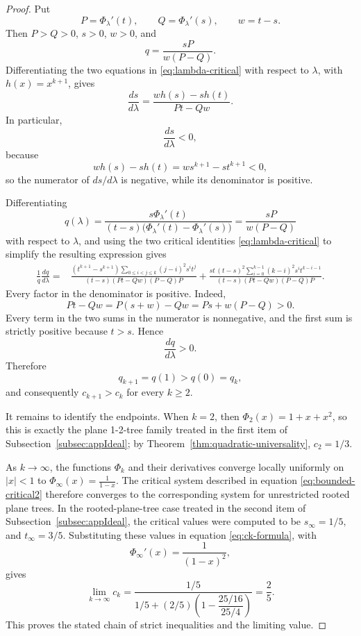 \documentclass[11pt, onesided]{amsart}
\theoremstyle{remark}
\begin{document}
\begin{proof}
Put
\[
P=\Phi_\lambda'(t),
\qquad
Q=\Phi_\lambda'(s),
\qquad
w=t-s.
\]
Then $P>Q>0$, $s>0$, $w>0$, and
\[
q=\frac{sP}{w(P-Q)}.
\]
Differentiating the two equations in \eqref{eq:lambda-critical} with respect to $\lambda$, with $h(x)=x^{k+1}$, gives
\[
\frac{ds}{d\lambda}
=
\frac{w h(s)-s h(t)}{Pt-Qw}.
\]
In particular,
\[
\frac{ds}{d\lambda}<0,
\]
because
\[
w h(s)-s h(t)
=w s^{k+1}-s t^{k+1}<0,
\] so the numerator of $ds/d\lambda$ is negative, while its denominator is positive. 

Differentiating
\[
q(\lambda)=
\frac{s\Phi_\lambda'(t)}
{(t-s)\bigl(\Phi_\lambda'(t)-\Phi_\lambda'(s)\bigr)}
=
\frac{sP}{w(P-Q)}
\]
with respect to $\lambda$, and using the two critical identities
\eqref{eq:lambda-critical} to simplify the resulting expression gives
\begin{align}
\label{eq:qderivative-positive}
\frac1q\frac{dq}{d\lambda}
={}&
\frac{
(t^{k+1}-s^{k+1})
\displaystyle\sum_{0\le i<j\le k}(j-i)^2s^it^j
}
{(t-s)(Pt-Qw)(P-Q)P}
+
\frac{
s t\,(t-s)^2
\displaystyle\sum_{i=0}^{k-1}(k-i)^2s^it^{k-i-1}
}
{(t-s)(Pt-Qw)(P-Q)P}.
\end{align}
Every factor in the denominator is positive.  Indeed,
\[
Pt-Qw=P(s+w)-Qw=Ps+w(P-Q)>0.
\]
Every term in the two sums in the numerator is nonnegative, and the first sum is strictly positive because $t>s$.  Hence
\[
\frac{dq}{d\lambda}>0.
\]
Therefore
\[
q_{k+1}=q(1)>q(0)=q_k,
\]
and consequently $c_{k+1}>c_k$ for every $k\ge2$.

It remains to identify the endpoints.  When $k=2$,
then
$\Phi_2(x)=1+x+x^2$,
so this is exactly the plane 1-2-tree family treated in the first item of Subsection~\ref{subsec:appIdeal}; by Theorem~\ref{thm:quadratic-universality},
$
c_2=1/3.
$ 

As $k\to\infty$, the functions $\Phi_k$ and their derivatives converge locally uniformly on $|x|<1$ to
$
\Phi_\infty(x)=\frac1{1-x}.
$
The critical system described in equation \eqref{eq:bounded-critical2} therefore converges to the corresponding system for unrestricted rooted plane trees.  In the rooted-plane-tree case treated in the second item of Subsection~\ref{subsec:appIdeal}, the critical values were computed to be
$
s_\infty=1/5,
$ and
$t_\infty=3/5.
$
Substituting these values in equation \eqref{eq:ck-formula}, with
\[
\Phi_\infty'(x)=\frac1{(1-x)^2},
\]
gives
\[
\lim_{k\to\infty}c_k
=
\frac{1/5}
{1/5+(2/5)\left(1-\dfrac{25/16}{25/4}\right)}
=\frac25.
\]
This proves the stated chain of strict inequalities and the limiting value.
\end{proof}
\end{document}
